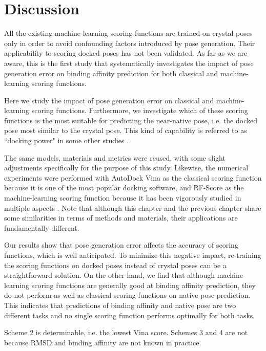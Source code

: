 \documentclass[twocolumn]{bmcart}
\begin{document}
\section*{Discussion}

All the existing machine-learning scoring functions are trained on crystal poses only in order to avoid confounding factors introduced by pose generation. Their applicability to scoring docked poses has not been validated. As far as we are aware, this is the first study that systematically investigates the impact of pose generation error on binding affinity prediction for both classical and machine-learning scoring functions.

Here we study the impact of pose generation error on classical and machine-learning scoring functions. Furthermore, we investigate which of these scoring functions is the most suitable for predicting the near-native pose, i.e. the docked pose most similar to the crystal pose. This kind of capability is referred to as ``docking power" in some other studies \cite{1411}.

The same models, materials and metrics were reused, with some slight adjustments specifically for the purpose of this study. Likewise, the numerical experiments were performed with AutoDock Vina \cite{595} as the classical scoring function because it is one of the most popular docking software, and RF-Score \cite{564} as the machine-learning scoring function because it has been vigorously studied in multiple aspects \cite{1281,1362,1370}. Note that although this chapter and the previous chapter share some similarities in terms of methods and materials, their applications are fundamentally different.

Our results show that pose generation error affects the accuracy of scoring functions, which is well anticipated. To minimize this negative impact, re-training the scoring functions on docked poses instead of crystal poses can be a straightforward solution. On the other hand, we find that although machine-learning scoring functions are generally good at binding affinity prediction, they do not perform as well as classical scoring functions on native pose prediction. This indicates that predictions of binding affinity and native pose are two different tasks and no single scoring function performs optimally for both tasks.

Scheme 2 is determinable, i.e. the lowest Vina score. Schemes 3 and 4 are not because RMSD and binding affinity are not known in practice.
\end{document}
